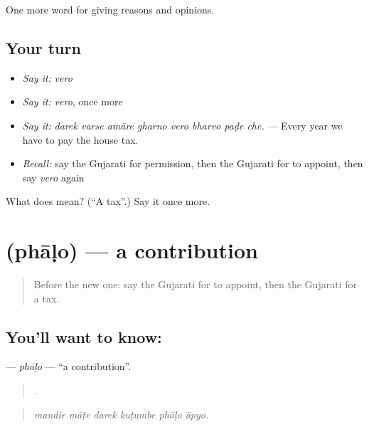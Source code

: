 \begin{grammarlens}[title={What you've built}]
One more word for giving reasons and opinions.
\end{grammarlens}

\subsection*{Your turn}
\begin{itemize}
\raggedright
  \item \emph{Say it:} \emph{vero}
  \item \emph{Say it:} \emph{vero}, once more
  \item \emph{Say it:} \emph{darek varse amāre gharno vero bharvo paḍe che.} — Every year we have to pay the house tax.
  \item \emph{Recall:} say the Gujarati for permission, then the Gujarati for to appoint, then say \emph{vero} again
\end{itemize}

\begin{tcolorbox}[breakable,colback=teal!4,colframe=teal!35!black,title={Before you move on}]
What does  mean? (\textquotedblleft{}A tax\textquotedblright{}.) Say it once more.
\end{tcolorbox}
\section[\texorpdfstring{\gu{ફાળો} (phāḷo)}{ફાળો (phāḷo)}]{ (phāḷo) — a contribution}

\label{lesson:GU-C355-phalo}



\begin{quote}
Before the new one: say the Gujarati for to appoint, then the Gujarati for a tax.
\end{quote}

\subsection*{You'll want to know: }
\textbf{} — \emph{phāḷo} — \textquotedblleft{}a contribution\textquotedblright{}.

\begin{quote}
     .
\end{quote}

\begin{quote}
\emph{mandir māṭe darek kuṭumbe phāḷo āpyo.}
\end{quote}

